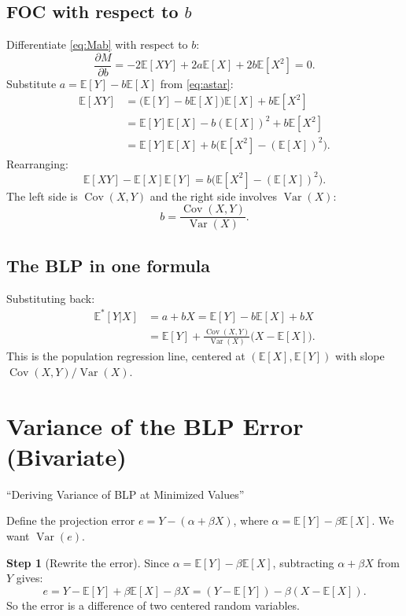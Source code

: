 \documentclass[12pt]{article}
\newcommand{\E}{\mathbb{E}}
\newcommand{\Var}{\operatorname{Var}}
\newcommand{\Cov}{\operatorname{Cov}}
\theoremstyle{definition}
\newtheorem{step}{Step}
\begin{document}
\subsection{FOC with respect to $b$}

Differentiate \eqref{eq:Mab} with respect to $b$:
\[
\frac{\partial M}{\partial b} = -2\E[XY] + 2a\E[X] + 2b\E[X^2] = 0.
\]
Substitute $a = \E[Y] - b\E[X]$ from \eqref{eq:astar}:
\begin{align*}
\E[XY] &= \bigl(\E[Y] - b\E[X]\bigr)\E[X] + b\E[X^2]\\
&= \E[Y]\E[X] - b(\E[X])^2 + b\E[X^2]\\
&= \E[Y]\E[X] + b\bigl(\E[X^2] - (\E[X])^2\bigr).
\end{align*}
Rearranging:
\[
\E[XY] - \E[X]\E[Y] = b\bigl(\E[X^2] - (\E[X])^2\bigr).
\]
The left side is $\Cov(X,Y)$ and the right side involves $\Var(X)$:
\begin{equation}
\boxed{b = \frac{\Cov(X,Y)}{\Var(X)}.} \label{eq:bstar}
\end{equation}

\subsection{The BLP in one formula}

Substituting back:
\begin{align*}
\E^*[Y|X] &= a + bX = \E[Y] - b\E[X] + bX\\
&= \E[Y] + \frac{\Cov(X,Y)}{\Var(X)}\bigl(X - \E[X]\bigr).
\end{align*}
This is the population regression line, centered at $(\E[X], \E[Y])$ with slope $\Cov(X,Y)/\Var(X)$.


\section{Variance of the BLP Error (Bivariate)}
\label{sec:bivar-var}

\begin{tcolorbox}[colback=blue!5, colframe=blue!50, title=Slide Reference]
``Deriving Variance of BLP at Minimized Values''
\end{tcolorbox}

Define the projection error $e = Y - (\alpha + \beta X)$, where $\alpha = \E[Y] - \beta\E[X]$. We want $\Var(e)$.

\begin{step}[Rewrite the error]
Since $\alpha = \E[Y] - \beta\E[X]$, subtracting $\alpha + \beta X$ from $Y$ gives:
\[
e = Y - \E[Y] + \beta\E[X] - \beta X = (Y - \E[Y]) - \beta(X - \E[X]).
\]
So the error is a difference of two centered random variables.
\end{step}
\end{document}
